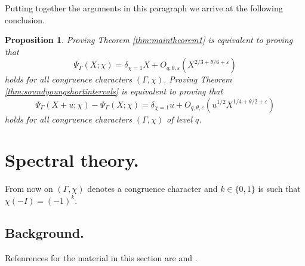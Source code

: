\documentclass{article}
\newtheorem{prop}[thm]{Proposition}
\theoremstyle{named}
\begin{document}
Putting together the arguments in this paragraph we arrive at the following conclusion.

\begin{prop}\label{prop:conclusionreductioncharacters}
Proving Theorem \ref{thm:maintheorem1} is equivalent to proving that
\begin{equation}\label{eq:estimatetobeprovenmaintheorem}
    \Psi_\Gamma(X; \chi) = \delta_{\chi = 1} X + O_{q, \theta,\varepsilon}(X^{2/3 + \theta/6 + \varepsilon})
\end{equation}
holds for all congruence characters $(\Gamma, \chi)$. Proving Theorem \ref{thm:soundyoungshortintervals} is equivalent to proving that  
\begin{equation}\label{eq:estimatetobeprovenshortintervals}
    \Psi_\Gamma(X + u; \chi) - \Psi_\Gamma(X; \chi) = \delta_{\chi = 1} u + O_{q, \theta, \varepsilon}(u^{1/2}X^{1/4 + \theta/2 + \varepsilon})
\end{equation}
holds for all congruence characters $(\Gamma, \chi)$ of level $q$.
\end{prop}



\section{Spectral theory.}\label{sec:spectralbackground}
From now on $(\Gamma, \chi)$ denotes a congruence character and $k \in \{0, 1\}$ is such that $\chi(-I) = (-1)^k$. 

\subsection{Background.}
Refenrences for the material in this section are \cite[Section 4]{DFIsubconvexityartin} and \cite[Chapter 9]{hejhal2}.
\end{document}
